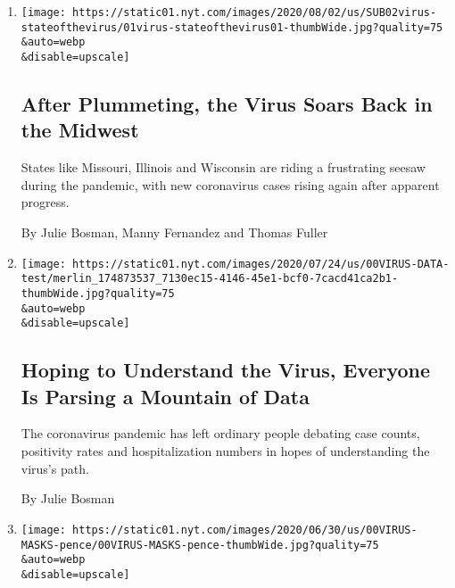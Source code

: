 \begin{enumerate}
\def\labelenumi{\arabic{enumi}.}
\item
  \href{/2020/08/01/us/coronavirus-midwest-cases-deaths.html}{}

  \texttt{[image: https://static01.nyt.com/images/2020/08/02/us/SUB02virus-stateofthevirus/01virus-stateofthevirus01-thumbWide.jpg?quality=75\\\&auto=webp\\\&disable=upscale]}

  \hypertarget{after-plummeting-the-virus-soars-back-in-the-midwest}{%
  \subsection{After Plummeting, the Virus Soars Back in the
  Midwest}\label{after-plummeting-the-virus-soars-back-in-the-midwest}}

  States like Missouri, Illinois and Wisconsin are riding a frustrating
  seesaw during the pandemic, with new coronavirus cases rising again
  after apparent progress.

  By Julie Bosman, Manny Fernandez and Thomas Fuller
\item
  \href{/2020/07/27/us/coronavirus-data.html}{}

  \texttt{[image: https://static01.nyt.com/images/2020/07/24/us/00VIRUS-DATA-test/merlin\_174873537\_7130ec15-4146-45e1-bcf0-7cacd41ca2b1-thumbWide.jpg?quality=75\\\&auto=webp\\\&disable=upscale]}

  \hypertarget{hoping-to-understand-the-virus-everyone-is-parsing-a-mountain-of-data}{%
  \subsection{Hoping to Understand the Virus, Everyone Is Parsing a
  Mountain of
  Data}\label{hoping-to-understand-the-virus-everyone-is-parsing-a-mountain-of-data}}

  The coronavirus pandemic has left ordinary people debating case
  counts, positivity rates and hospitalization numbers in hopes of
  understanding the virus's path.

  By Julie Bosman
\item
  \href{/2020/07/01/us/coronavirus-masks.html}{}

  \texttt{[image: https://static01.nyt.com/images/2020/06/30/us/00VIRUS-MASKS-pence/00VIRUS-MASKS-pence-thumbWide.jpg?quality=75\\\&auto=webp\\\&disable=upscale]}

  \hypertarget{amid-virus-surge-republicans-abruptly-urge-masks-despite-trumps-resistance}{%
}
\end{enumerate}
